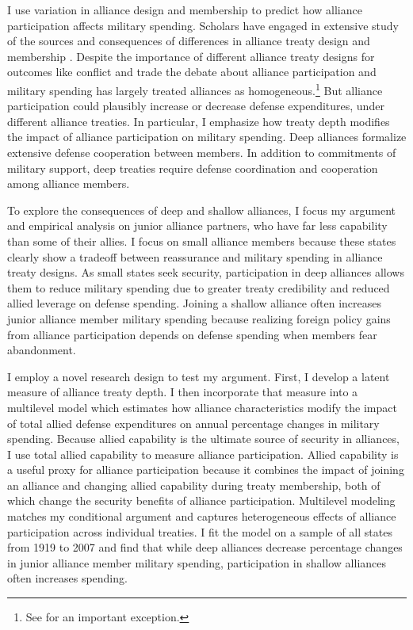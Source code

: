 \documentclass[12pt]{article}
\begin{document}
I use variation in alliance design and membership to predict how alliance participation affects military spending. 
Scholars have engaged in extensive study of the sources and consequences of differences in alliance treaty design and membership \citep{Mattes2012, Benson2012, Poast2019a, Morrow1991, Leeds2003, LeedsAnac2005, Fordham2010, Mattes2012,  Poast2013, Johnsonetal2015}. 
Despite the importance of different alliance treaty designs for outcomes like conflict \citep{Leeds2003, Benson2012} and trade \citep{Long2003, LongLeeds2006} the debate about alliance participation and military spending has largely treated alliances as homogeneous.\footnote{See \citet{DigiuseppePoast2016} for an important exception.}
But alliance participation could plausibly increase or decrease defense expenditures, under different alliance treaties. 
In particular, I emphasize how treaty depth modifies the impact of alliance participation on military spending. 
Deep alliances formalize extensive defense cooperation between members. 
In addition to commitments of military support, deep treaties require defense coordination and cooperation among alliance members. 


To explore the consequences of deep and shallow alliances, I focus my argument and empirical analysis on junior alliance partners, who have far less capability than some of their allies. 
I focus on small alliance members because these states clearly show a tradeoff between reassurance and military spending in alliance treaty designs.
As small states seek security, participation in deep alliances allows them to reduce military spending due to greater treaty credibility and reduced allied leverage on defense spending. 
Joining a shallow alliance often increases junior alliance member military spending because realizing foreign policy gains from alliance participation depends on defense spending when members fear abandonment.

 
I employ a novel research design to test my argument.
First, I develop a latent measure of alliance treaty depth. 
I then incorporate that measure into a multilevel model which estimates how alliance characteristics modify the impact of total allied defense expenditures on annual percentage changes in military spending.
Because allied capability is the ultimate source of security in alliances, I use total allied capability to measure alliance participation.  
Allied capability is a useful proxy for alliance participation because it combines the impact of joining an alliance and changing allied capability during treaty membership, both of which change the security benefits of alliance participation. 
Multilevel modeling matches my conditional argument and captures heterogeneous effects of alliance participation across individual treaties. 
I fit the model on a sample of all states from 1919 to 2007 and find that while deep alliances decrease percentage changes in junior alliance member military spending, participation in shallow alliances often increases spending.
\end{document}
